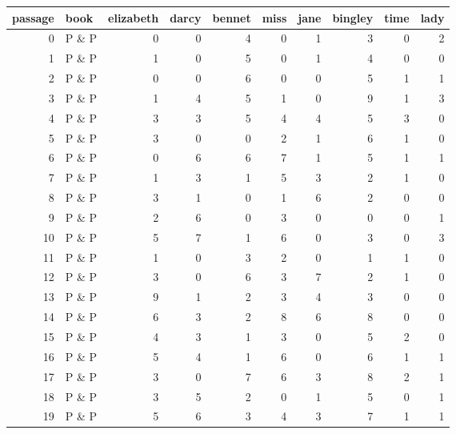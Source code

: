 \begin{table}[ht]
\centering
{\ttfamily
\def\arraystretch{1}
\setlength{\tabcolsep}{0.2em} %
\begin{tabular}{rlrrrrrrrr}
  \hline
passage & book & elizabeth & darcy & bennet & miss & jane & bingley & time & lady \\ 
  \hline
  0 & P \& P &   0 &   0 &   4 &   0 &   1 &   3 &   0 &   2 \\ 
    1 & P \& P &   1 &   0 &   5 &   0 &   1 &   4 &   0 &   0 \\ 
    2 & P \& P &   0 &   0 &   6 &   0 &   0 &   5 &   1 &   1 \\ 
    3 & P \& P &   1 &   4 &   5 &   1 &   0 &   9 &   1 &   3 \\ 
    4 & P \& P &   3 &   3 &   5 &   4 &   4 &   5 &   3 &   0 \\ 
    5 & P \& P &   3 &   0 &   0 &   2 &   1 &   6 &   1 &   0 \\ 
    6 & P \& P &   0 &   6 &   6 &   7 &   1 &   5 &   1 &   1 \\ 
    7 & P \& P &   1 &   3 &   1 &   5 &   3 &   2 &   1 &   0 \\ 
    8 & P \& P &   3 &   1 &   0 &   1 &   6 &   2 &   0 &   0 \\ 
    9 & P \& P &   2 &   6 &   0 &   3 &   0 &   0 &   0 &   1 \\ 
   10 & P \& P &   5 &   7 &   1 &   6 &   0 &   3 &   0 &   3 \\ 
   11 & P \& P &   1 &   0 &   3 &   2 &   0 &   1 &   1 &   0 \\ 
   12 & P \& P &   3 &   0 &   6 &   3 &   7 &   2 &   1 &   0 \\ 
   13 & P \& P &   9 &   1 &   2 &   3 &   4 &   3 &   0 &   0 \\ 
   14 & P \& P &   6 &   3 &   2 &   8 &   6 &   8 &   0 &   0 \\ 
   15 & P \& P &   4 &   3 &   1 &   3 &   0 &   5 &   2 &   0 \\ 
   16 & P \& P &   5 &   4 &   1 &   6 &   0 &   6 &   1 &   1 \\ 
   17 & P \& P &   3 &   0 &   7 &   6 &   3 &   8 &   2 &   1 \\ 
   18 & P \& P &   3 &   5 &   2 &   0 &   1 &   5 &   0 &   1 \\ 
   19 & P \& P &   5 &   6 &   3 &   4 &   3 &   7 &   1 &   1 \\ 
   \hline
\end{tabular}
}
\end{table}
